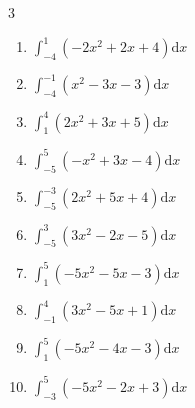 \begin{multicols}{3}
\begin{enumerate}

  \item $\displaystyle \int_{-4}^{1}\left( -2x^{2}+2x+4 \right) \mathrm{d}x$

        \phantom{$\displaystyle =-55$}

  \item $\displaystyle \int_{-4}^{-1}\left( x^{2}-3x-3 \right) \mathrm{d}x$

        \phantom{$\displaystyle =42$}

  \item $\displaystyle \int_{1}^{4}\left( 2x^{2}+3x+5 \right) \mathrm{d}x$

        \phantom{$\displaystyle =67$}

  \item $\displaystyle \int_{-5}^{5}\left( -x^{2}+3x-4 \right) \mathrm{d}x$

        \phantom{$\displaystyle =-90$}

\columnbreak %

  \item $\displaystyle \int_{-5}^{-3}\left( 2x^{2}+5x+4 \right) \mathrm{d}x$


  \item $\displaystyle \int_{-5}^{3}\left( 3x^{2}-2x-5 \right) \mathrm{d}x$


  \item $\displaystyle \int_{1}^{5}\left( -5x^{2}-5x-3 \right) \mathrm{d}x$


  \item $\displaystyle \int_{-1}^{4}\left( 3x^{2}-5x+1 \right) \mathrm{d}x$


  \item $\displaystyle \int_{1}^{5}\left( -5x^{2}-4x-3 \right) \mathrm{d}x$


\columnbreak %

  \item $\displaystyle \int_{-3}^{5}\left( -5x^{2}-2x+3 \right) \mathrm{d}x$



\end{enumerate}
\end{multicols}
